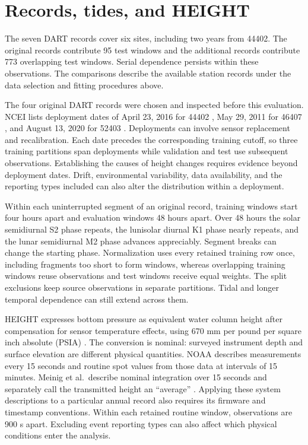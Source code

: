 \documentclass{article}
\begin{document}
\section{Records, tides, and HEIGHT}
\label{sec:scope}
The seven DART records cover six sites, including two years from 44402. The original records contribute 95 test windows and the additional records contribute 773 overlapping test windows. Serial dependence persists within these observations. The comparisons describe the available station records under the data selection and fitting procedures above.

The four original DART records were chosen and inspected before this evaluation. NCEI lists deployment dates of April 23, 2016 for 44402 \citep{NCEIDART44402}, May 29, 2011 for 46407 \citep{NCEIDART46407}, and August 13, 2020 for 52403 \citep{NCEIDART52403}. Deployments can involve sensor replacement and recalibration. Each date precedes the corresponding training cutoff, so three training partitions span deployments while validation and test use subsequent observations. Establishing the causes of height changes requires evidence beyond deployment dates. Drift, environmental variability, data availability, and the reporting types included can also alter the distribution within a deployment.

Within each uninterrupted segment of an original record, training windows start four hours apart and evaluation windows 48 hours apart. Over 48 hours the solar semidiurnal S2 phase repeats, the lunisolar diurnal K1 phase nearly repeats, and the lunar semidiurnal M2 phase advances appreciably. Segment breaks can change the starting phase. Normalization uses every retained training row once, including fragments too short to form windows, whereas overlapping training windows reuse observations and test windows receive equal weights. The split exclusions keep source observations in separate partitions. Tidal and longer temporal dependence can still extend across them.

HEIGHT expresses bottom pressure as equivalent water column height after compensation for sensor temperature effects, using 670 mm per pound per square inch absolute (PSIA) \citep{NDBCDARTDescription,Meinig2005DARTII}. The conversion is nominal: surveyed instrument depth and surface elevation are different physical quantities. NOAA describes measurements every 15 seconds and routine spot values from those data at intervals of 15 minutes. Meinig et al.\ describe nominal integration over 15 seconds and separately call the transmitted height an ``average'' \citep[Sections 3.3.1, 3.3.2, and 3.3.8]{Meinig2005DARTII}. Applying these system descriptions to a particular annual record also requires its firmware and timestamp conventions. Within each retained routine window, observations are 900 s apart. Excluding event reporting types can also affect which physical conditions enter the analysis.
\end{document}
